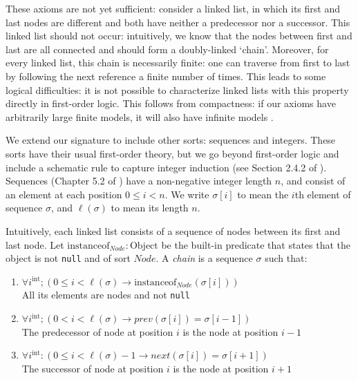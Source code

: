\documentclass[runningheads]{llncs}
\begin{document}
These axioms are not yet sufficient: consider a linked list, in which its first and last nodes are different and both have neither a predecessor nor a successor. This linked list should not occur: intuitively, we know that the nodes between first and last are all connected and should form a doubly-linked `chain'. Moreover, for every linked list, this chain is necessarily finite: one can traverse from first to last by following the next reference a finite number of times. This leads to some logical difficulties: it is not possible to characterize linked lists with this property directly in first-order logic. This follows from compactness: if our axioms have arbitrarily large finite models, it will also have infinite models \cite{benthem2001hol}.

We extend our signature to include other sorts: sequences and integers. These sorts have their usual first-order theory, but we go beyond first-order logic and include a schematic rule to capture integer induction (see Section 2.4.2 of \cite{KeYbook}). Sequences (Chapter 5.2 of \cite{KeYbook}) have a non-negative integer length $n$, and consist of an element at each position $0\leq i<n$. We write $\sigma[i]$ to mean the $i$th element of sequence $\sigma$, and $\ell(\sigma)$ to mean its length $n$.

Intuitively, each linked list consists of a sequence of nodes between its first and last node. Let $\mathrm{instanceof}_\mathit{Node}: \mathrm{Object}$ be the built-in predicate that states that the object is not \texttt{null} and of sort $\mathit{Node}$. A \emph{chain} is a sequence $\sigma$ such that:

\begin{enumerate}[label=(\alph*)]
    \item $\forall i^\mathrm{int}; (0\leq i<\ell(\sigma)\to \mathrm{instanceof}_\mathit{Node}(\sigma[i]))$\\
    All its elements are nodes and not \texttt{null}
    \item $\forall i^\mathrm{int}; (0<i<\ell(\sigma)\to \mathit{prev}(\sigma[i]) = \sigma[i-1])$\\
    The predecessor of node at position $i$ is the node at position $i-1$
    \item $\forall i^\mathrm{int}: (0\leq i<\ell(\sigma)-1\to \mathit{next}(\sigma[i]) = \sigma[i+1])$\\
    The successor of node at position $i$ is the node at position $i+1$
\end{enumerate}
\end{document}
